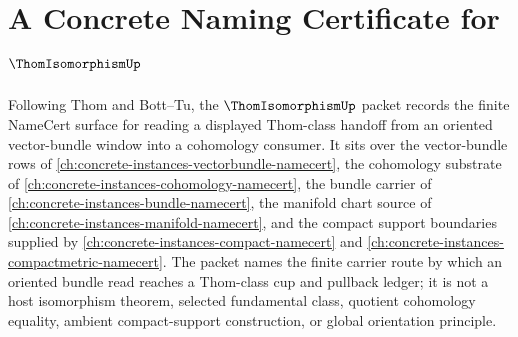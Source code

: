 \chapter{A Concrete Naming Certificate for $\ThomIsomorphismUp$}
\label{ch:concrete-instances-thom-isomorphism-namecert}

Following Thom and Bott--Tu, the $\ThomIsomorphismUp$ packet records the finite NameCert surface for reading a displayed Thom-class handoff from an oriented vector-bundle window into a cohomology consumer. It sits over the vector-bundle rows of \autoref{ch:concrete-instances-vectorbundle-namecert}, the cohomology substrate of \autoref{ch:concrete-instances-cohomology-namecert}, the bundle carrier of \autoref{ch:concrete-instances-bundle-namecert}, the manifold chart source of \autoref{ch:concrete-instances-manifold-namecert}, and the compact support boundaries supplied by \autoref{ch:concrete-instances-compact-namecert} and \autoref{ch:concrete-instances-compactmetric-namecert}. The packet names the finite carrier route by which an oriented bundle read reaches a Thom-class cup and pullback ledger; it is not a host isomorphism theorem, selected fundamental class, quotient cohomology equality, ambient compact-support construction, or global orientation principle.

